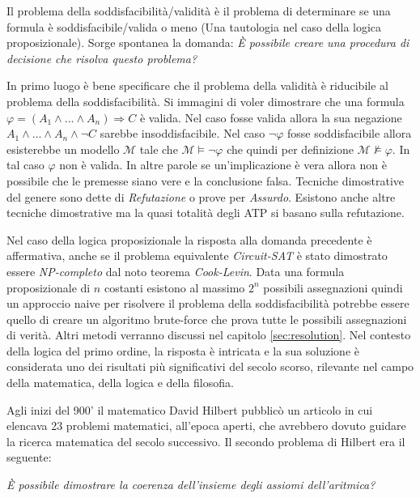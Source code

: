 \documentclass[./main.tex]{subfiles}
\begin{document}
Il problema della soddisfacibilità/validità è il problema di determinare 
se una formula è soddisfacibile/valida o meno (Una tautologia nel caso della logica proposizionale).
Sorge spontanea la domanda: \textit{È possibile creare una procedura di decisione che risolva questo problema?} 

In primo luogo è bene specificare che il problema della validità è riducibile al problema della soddisfacibilità.
Si immagini di voler dimostrare che una formula $\varphi = (A_1 \land ... \land A_n) \Rightarrow C$ è valida.
Nel caso fosse valida allora la sua negazione $A_1 \land ... \land A_n \land \lnot C$ sarebbe insoddisfacibile.
Nel caso $\lnot \varphi$ fosse soddisfacibile allora esisterebbe
 un modello $\mathcal{M}$ tale che $\mathcal{M} \models \lnot \varphi$ che quindi per definizione 
$\mathcal{M} \not\models \varphi$. In tal caso $\varphi$ non è valida.
In altre parole se un'implicazione è vera allora non è possibile che le premesse siano vere e la conclusione falsa.
Tecniche dimostrative del genere sono dette di \textit{Refutazione} o prove per \textit{Assurdo}.
Esistono anche altre tecniche dimostrative ma la quasi totalità degli ATP si basano sulla refutazione.


Nel caso della logica proposizionale la risposta alla domanda precedente è affermativa, 
anche se il problema equivalente \textit{Circuit-SAT} è stato dimostrato essere \textit{NP-completo} dal noto teorema \textit{Cook-Levin}.
Data una formula proposizionale di $n$ costanti esistono al massimo $2^n$ possibili assegnazioni quindi
un approccio naive per risolvere il problema della soddisfacibilità potrebbe essere quello di creare un algoritmo brute-force 
che prova tutte le possibili assegnazioni di verità. Altri metodi verranno discussi nel capitolo \ref{sec:resolution}.
Nel contesto della logica del primo ordine, 
la risposta è intricata e la sua soluzione è considerata uno dei risultati più significativi del secolo scorso, 
rilevante nel campo della matematica, della logica e della filosofia.


Agli inizi del 900' il matematico David Hilbert pubblicò un articolo in cui elencava 23 problemi matematici, all'epoca aperti,
che avrebbero dovuto guidare la ricerca matematica del secolo successivo. Il secondo problema di Hilbert era il seguente:

\begin{displayquote}
  \textit{È possibile dimostrare la coerenza dell'insieme degli assiomi dell'aritmica?}
\end{displayquote}
\end{document}
